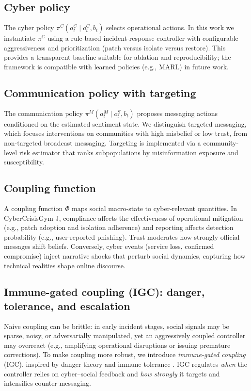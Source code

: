 \documentclass[biomimetics,article,submit,pdftex,moreauthors]{Definitions/mdpi}
\newcommand{\envname}{CyberCrisisGym-J}
\begin{document}
\subsection{Cyber policy}
The cyber policy $\pi^C(a^C_t \mid o^C_t, b_t)$ selects operational actions. In this work we instantiate $\pi^C$ using a rule-based incident-response controller with configurable aggressiveness and prioritization (patch versus isolate versus restore). This provides a transparent baseline suitable for ablation and reproducibility; the framework is compatible with learned policies (e.g., MARL) in future work.

\subsection{Communication policy with targeting}
The communication policy $\pi^M(a^M_t \mid o^S_t, b_t)$ proposes messaging actions conditioned on the estimated sentiment state. We distinguish targeted messaging, which focuses interventions on communities with high misbelief or low trust, from non-targeted broadcast messaging. Targeting is implemented via a community-level risk estimator that ranks subpopulations by misinformation exposure and susceptibility.

\subsection{Coupling function}
A coupling function $\Phi$ maps social macro-state to cyber-relevant quantities. In \envname{}, compliance affects the effectiveness of operational mitigation (e.g., patch adoption and isolation adherence) and reporting affects detection probability (e.g., user-reported phishing). Trust moderates how strongly official messages shift beliefs. Conversely, cyber events (service loss, confirmed compromise) inject narrative shocks that perturb social dynamics, capturing how technical realities shape online discourse.


\subsection{Immune-gated coupling (IGC): danger, tolerance, and escalation}
\label{sec:igc}
Naive coupling can be brittle: in early incident stages, social signals may be sparse, noisy, or adversarially manipulated, yet an aggressively coupled controller may overreact (e.g., amplifying operational disruptions or issuing premature corrections).
To make coupling more robust, we introduce \emph{immune-gated coupling} (IGC), inspired by danger theory and immune tolerance \citep{matzinger1994tolerance}.
IGC regulates \emph{when} the controller relies on cyber--social feedback and \emph{how strongly} it targets and intensifies counter-messaging.
\end{document}
